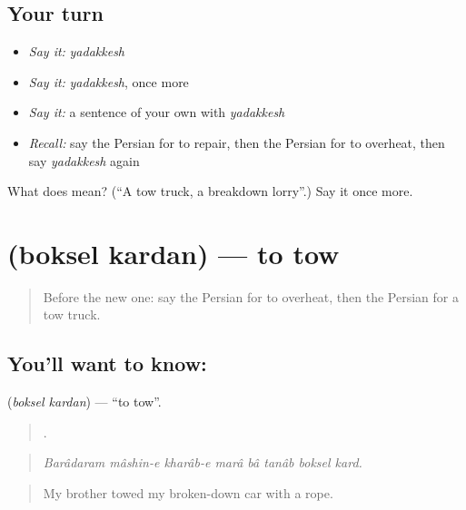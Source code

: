 \subsection*{Your turn}
\begin{itemize}
\raggedright
  \item \emph{Say it:} \emph{yadakkesh}
  \item \emph{Say it:} \emph{yadakkesh}, once more
  \item \emph{Say it:} a sentence of your own with \emph{yadakkesh}
  \item \emph{Recall:} say the Persian for to repair, then the Persian for to overheat, then say \emph{yadakkesh} again
\end{itemize}

\begin{tcolorbox}[breakable,colback=teal!4,colframe=teal!35!black,title={Before you move on}]
What does   mean? (\textquotedblleft{}A tow truck, a breakdown lorry\textquotedblright{}.) Say it once more.
\end{tcolorbox}
\section[\texorpdfstring{\fa{بکسل} \fa{کردن} (boksel kardan)}{بکسل کردن (boksel kardan)}]{  (boksel kardan) — to tow}

\label{lesson:FA-C427-boksel-kardan}



\begin{quote}
Before the new one: say the Persian for to overheat, then the Persian for a tow truck.
\end{quote}

\subsection*{You'll want to know:  }
\textbf{ } (\emph{boksel kardan}) — \textquotedblleft{}to tow\textquotedblright{}.

\begin{quote}
       .
\end{quote}

\begin{quote}
\emph{Barâdaram mâshin-e kharâb-e marâ bâ tanâb boksel kard.}
\end{quote}

\begin{quote}
My brother towed my broken-down car with a rope.
\end{quote}

